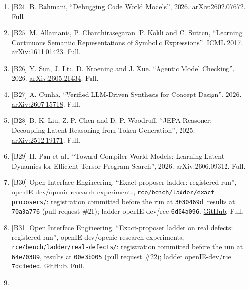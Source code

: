 \documentclass[10pt,letterpaper]{article}
\begin{document}
\begin{enumerate}
  Research on Code Generation with World Models'', 2025.
  \href{https://arxiv.org/abs/2510.02387}{arXiv:2510.02387}. Full.
\item
  {[}B24{]} B. Rahmani, ``Debugging Code World Models'', 2026.
  \href{https://arxiv.org/abs/2602.07672}{arXiv:2602.07672}. Full.
\item
  {[}B25{]} M. Allamanis, P. Chanthirasegaran, P. Kohli and C. Sutton,
  ``Learning Continuous Semantic Representations of Symbolic
  Expressions'', ICML 2017.
  \href{https://arxiv.org/abs/1611.01423}{arXiv:1611.01423}. Full.
\item
  {[}B26{]} Y. Sun, J. Liu, D. Kroening and J. Xue, ``Agentic Model
  Checking'', 2026.
  \href{https://arxiv.org/abs/2605.21434}{arXiv:2605.21434}. Full.
\item
  {[}B27{]} A. Cunha, ``Verified LLM-Driven Synthesis for Concept
  Design'', 2026.
  \href{https://arxiv.org/abs/2607.15718}{arXiv:2607.15718}. Full.
\item
  {[}B28{]} B. K. Liu, Z. P. Chen and D. P. Woodruff, ``JEPA-Reasoner:
  Decoupling Latent Reasoning from Token Generation'', 2025.
  \href{https://arxiv.org/abs/2512.19171}{arXiv:2512.19171}. Full.
\item
  {[}B29{]} H. Pan et al., ``Toward Compiler World Models: Learning
  Latent Dynamics for Efficient Tensor Program Search'', 2026.
  \href{https://arxiv.org/abs/2606.09312}{arXiv:2606.09312}. Full.
\item
  {[}B30{]} Open Interface Engineering, ``Exact-proposer ladder:
  registered run'', openIE-dev/openie-research-experiments,
  \texttt{rce/\allowbreak{}bench/\allowbreak{}ladder/\allowbreak{}exact-\allowbreak{}proposers/\allowbreak{}}: registration committed
  before the run at \texttt{3030469d}, results at \texttt{70a0a776}
  (pull request \#21); ladder openIE-dev/rce \texttt{6d04a096}.
  \href{https://github.com/openIE-dev/openie-research-experiments/tree/main/rce/bench/ladder/exact-proposers}{GitHub}.
  Full.
\item
  {[}B31{]} Open Interface Engineering, ``Exact-proposer ladder on real
  defects: registered run'', openIE-dev/openie-research-experiments,
  \texttt{rce/\allowbreak{}bench/\allowbreak{}ladder/\allowbreak{}real-\allowbreak{}defects/\allowbreak{}}: registration committed before
  the run at \texttt{64e70389}, results at \texttt{00e3b005} (pull
  request \#22); ladder openIE-dev/rce \texttt{7dc4eded}.
  \href{https://github.com/openIE-dev/openie-research-experiments/tree/main/rce/bench/ladder/real-defects}{GitHub}.
  Full.
\item

\end{enumerate}
\end{document}
